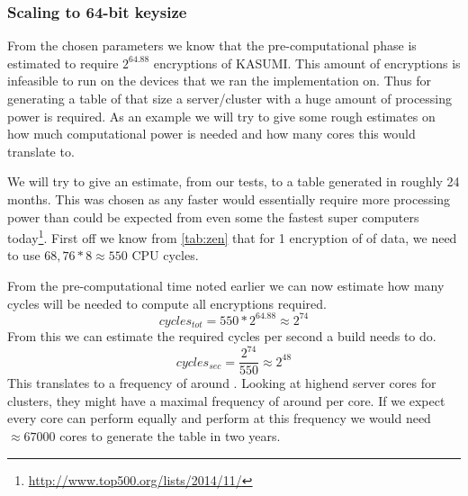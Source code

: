 \subsubsection*{Scaling to 64-bit keysize}
From the chosen parameters we know that the pre-computational phase is
estimated to require $2^{64.88}$ encryptions of KASUMI. This amount of encryptions
is infeasible to run on the devices that we ran the
 implementation on. Thus for generating a table of that
size a server/cluster with a huge amount of processing power is
required. As an example we will try to give some rough estimates on
how much computational power is needed and how many cores this would
translate to.

We will try to give an estimate, from our tests, to a table generated
in roughly 24 months. This was chosen as any faster would essentially
require more processing power than could be expected from even some the
fastest super computers
today\footnote{\url{http://www.top500.org/lists/2014/11/}}. First off
we know from \ref{tab:zen} that for 1 encryption of
 of data, we need to use $68,76 * 8 \approx 550$ CPU
cycles. 

From the pre-computational time noted earlier we can now estimate how
many cycles will be needed to compute all encryptions required.
\[ cycles_{tot} = 550 * 2^{64.88} \approx 2^{74}\]
From this we can estimate the required cycles per second a build needs
to do. 
\[ cycles_{sec} = \frac{2^{74}}{550} \approx 2^{48}\]
This translates to a frequency of around  . Looking at
highend server cores for clusters, they might have a maximal frequency
of around per core. If we expect every core can perform
equally and perform at this frequency we would need $\approx 67000$
cores to generate the table in two years.


